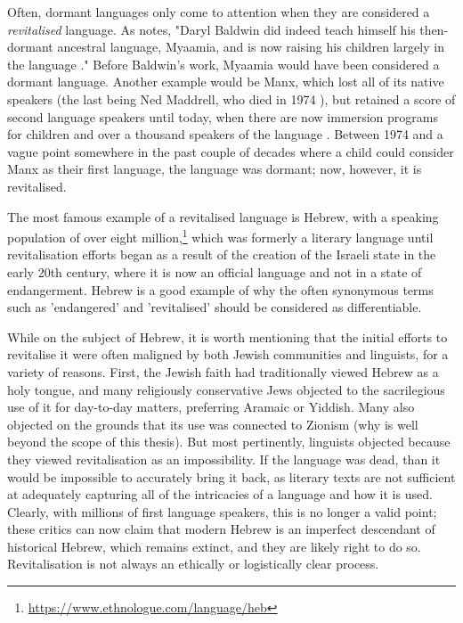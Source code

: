 Often, dormant languages only come to attention when they are considered a \textit{revitalised} language. As \citet{warner2007ethics} notes, "Daryl Baldwin did indeed teach himself his then-dormant ancestral language, Myaamia, and is now raising his children largely in the language \citep{hinton2001sleeping, leonard2004acquisition}." Before Baldwin's work, Myaamia would have been considered a dormant language. Another example would be Manx, which lost all of its native speakers (the last being Ned Maddrell, who died in 1974 \citep{wilson2008revitalization}), but retained a score of second language speakers until today, when there are now immersion programs for children and over a thousand speakers of the language \citep{clague2009manx}. Between 1974 and a vague point somewhere in the past couple of decades where a child could consider Manx as their first language, the language was dormant; now, however, it is revitalised.

The most famous example of a revitalised language is Hebrew, with a speaking population of over eight million,\footnote{\href{https://www.ethnologue.com/language/heb}{https://www.ethnologue.com/language/heb}} which was formerly a literary language until revitalisation efforts began as a result of the creation of the Israeli state in the early 20th century, where it is now an official language and not in a state of endangerment. Hebrew is a good example of why the often synonymous terms such as 'endangered' and 'revitalised' should be considered as differentiable.

While on the subject of Hebrew, it is worth mentioning that the initial efforts to revitalise it were often maligned by both Jewish communities and linguists, for a variety of reasons. First, the Jewish faith had traditionally viewed Hebrew as a holy tongue, and many religiously conservative Jews objected to the sacrilegious use of it for day-to-day matters, preferring Aramaic or Yiddish. Many also objected on the grounds that its use was connected to Zionism (why is well beyond the scope of this thesis). But most pertinently, linguists objected because they viewed revitalisation as an impossibility. If the language was dead, than it would be impossible to accurately bring it back, as literary texts are not sufficient at adequately capturing all of the intricacies of a language and how it is used. Clearly, with millions of first language speakers, this is no longer a valid point; these critics can now claim that modern Hebrew is an imperfect descendant of historical Hebrew, which remains extinct, and they are likely right to do so. Revitalisation is not always an ethically or logistically clear process.

